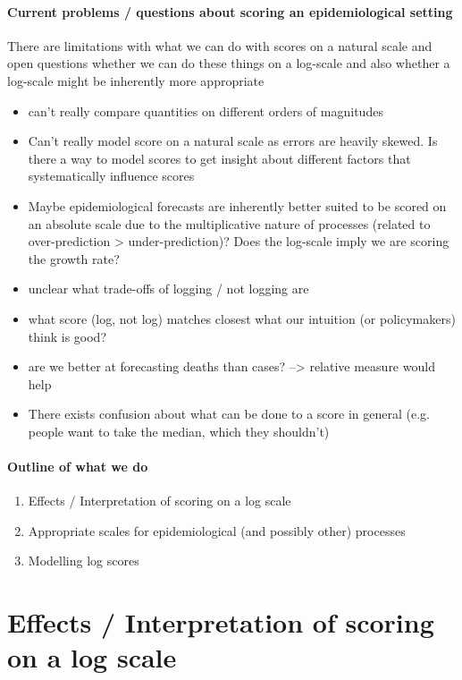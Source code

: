 \documentclass{article}
\begin{document}
\paragraph{Current problems / questions about scoring an epidemiological setting}
There are limitations with what we can do with scores on a natural scale and open questions whether we can do these things on a log-scale and also whether a log-scale might be inherently more appropriate
\begin{itemize}
    \item can't really compare quantities on different orders of magnitudes
    \item Can't really model score on a natural scale as errors are heavily skewed. Is there a way to model scores to get insight about different factors that systematically influence scores
    \item Maybe epidemiological forecasts are inherently better suited to be scored on an absolute scale due to the multiplicative nature of processes (related to over-prediction > under-prediction)? Does the log-scale imply we are scoring the growth rate? 
    \item unclear what trade-offs of logging / not logging are
    \item what score (log, not log) matches closest what our intuition (or policymakers) think is good? 
    \item are we better at forecasting deaths than cases? --> relative measure would help
    \item There exists confusion about what can be done to a score in general (e.g. people want to take the median, which they shouldn't) %
\end{itemize}

\paragraph{Outline of what we do}

\begin{enumerate}
    \item Effects / Interpretation of scoring on a log scale
    \item Appropriate scales for epidemiological (and possibly other) processes
    \item Modelling log scores
\end{enumerate}


\section{Effects / Interpretation of scoring on a log scale}
\end{document}
